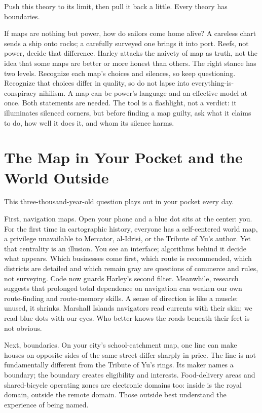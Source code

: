 Push this theory to its limit, then pull it back a little. Every theory has boundaries.

If maps are nothing but power, how do sailors come home alive? A careless chart sends a ship onto rocks; a carefully surveyed one brings it into port. Reefs, not power, decide that difference. Harley attacks the naivety of map as truth, not the idea that some maps are better or more honest than others. The right stance has two levels. Recognize each map's choices and silences, so keep questioning. Recognize that choices differ in quality, so do not lapse into everything-is-conspiracy nihilism. A map can be power's language and an effective model at once. Both statements are needed. The tool is a flashlight, not a verdict: it illuminates silenced corners, but before finding a map guilty, ask what it claims to do, how well it does it, and whom its silence harms.

\section{The Map in Your Pocket and the World Outside}
This three-thousand-year-old question plays out in your pocket every day.

First, navigation maps. Open your phone and a blue dot sits at the center: you. For the first time in cartographic history, everyone has a self-centered world map, a privilege unavailable to Mercator, al-Idrisi, or the Tribute of Yu's author. Yet that centrality is an illusion. You see an interface; algorithms behind it decide what appears. Which businesses come first, which route is recommended, which districts are detailed and which remain gray are questions of commerce and rules, not surveying. Code now guards Harley's second filter. Meanwhile, research suggests that prolonged total dependence on navigation can weaken our own route-finding and route-memory skills. A sense of direction is like a muscle: unused, it shrinks. Marshall Islands navigators read currents with their skin; we read blue dots with our eyes. Who better knows the roads beneath their feet is not obvious.

Next, boundaries. On your city's school-catchment map, one line can make houses on opposite sides of the same street differ sharply in price. The line is not fundamentally different from the Tribute of Yu's rings. Its maker names a boundary; the boundary creates eligibility and interests. Food-delivery areas and shared-bicycle operating zones are electronic domains too: inside is the royal domain, outside the remote domain. Those outside best understand the experience of being named.

